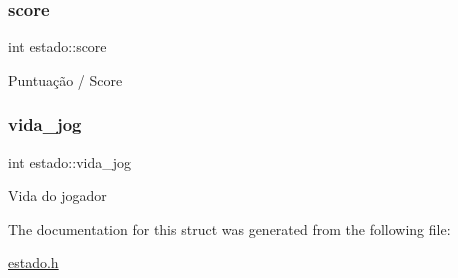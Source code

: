 \subsubsection{\texorpdfstring{score}{score}}
{\footnotesize\ttfamily int estado\+::score}

Puntuação / Score \mbox{\label{structestado_ac8ed787a79a1eb429563efe0ee0c1367}} 
\subsubsection{\texorpdfstring{vida\+\_\+jog}{vida\_jog}}
{\footnotesize\ttfamily int estado\+::vida\+\_\+jog}

Vida do jogador 

The documentation for this struct was generated from the following file\+:\begin{DoxyCompactItemize}
\item 
\hyperlink{estado_8h}{estado.\+h}\end{DoxyCompactItemize}
